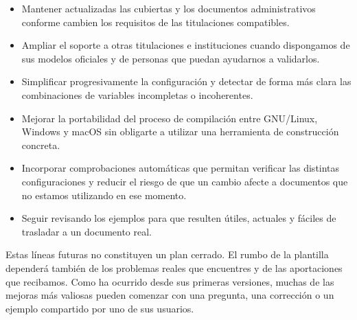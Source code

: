 \begin{itemize}
  \item Mantener actualizadas las cubiertas y los documentos administrativos conforme cambien los requisitos de las titulaciones compatibles.
  \item Ampliar el soporte a otras titulaciones e instituciones cuando dispongamos de sus modelos oficiales y de personas que puedan ayudarnos a validarlos.
  \item Simplificar progresivamente la configuración y detectar de forma más clara las combinaciones de variables incompletas o incoherentes.
  \item Mejorar la portabilidad del proceso de compilación entre GNU/Linux, Windows y macOS sin obligarte a utilizar una herramienta de construcción concreta.
  \item Incorporar comprobaciones automáticas que permitan verificar las distintas configuraciones y reducir el riesgo de que un cambio afecte a documentos que no estamos utilizando en ese momento.
  \item Seguir revisando los ejemplos para que resulten útiles, actuales y fáciles de trasladar a un documento real.
\end{itemize}

Estas líneas futuras no constituyen un plan cerrado. El rumbo de la plantilla dependerá también de los problemas reales que encuentres y de las aportaciones que recibamos. Como ha ocurrido desde sus primeras versiones, muchas de las mejoras más valiosas pueden comenzar con una pregunta, una corrección o un ejemplo compartido por uno de sus usuarios.








